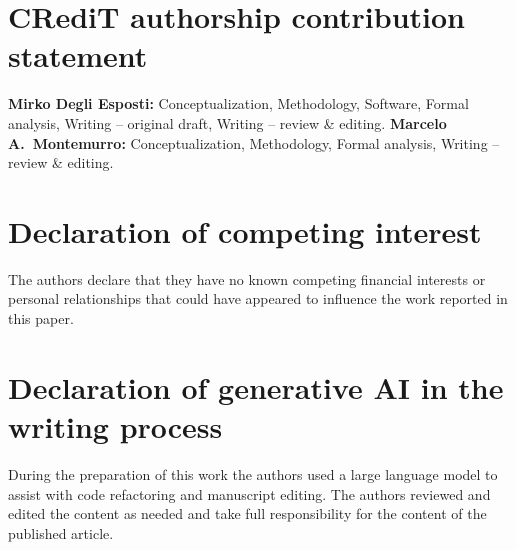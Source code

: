 \documentclass[12pt,a4paper]{article}
\newcommand{\TODO}[1]{\textcolor{red}{\textbf{[TODO: #1]}}}
\newcommand{\NOTE}[1]{\textcolor{blue}{\textbf{[NOTE: #1]}}}
\begin{document}
%
%


\section*{CRediT authorship contribution statement}
\textbf{Mirko Degli Esposti:} Conceptualization, Methodology, Software,
Formal analysis, Writing -- original draft, Writing -- review \& editing.
\textbf{Marcelo A.\ Montemurro:} Conceptualization, Methodology,
Formal analysis, Writing -- review \& editing.
 
\section*{Declaration of competing interest}
The authors declare that they have no known competing financial
interests or personal relationships that could have appeared to
influence the work reported in this paper.
 
\section*{Declaration of generative AI in the writing process}
During the preparation of this work the authors used a large language
model to assist with code refactoring and manuscript editing. The
authors reviewed and edited the content as needed and take full
responsibility for the content of the published article.
 
\end{document}
